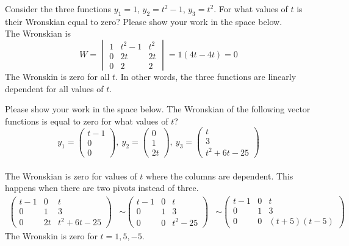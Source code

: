 \ifnum {}
\question[2] Consider the three functions $y_1 = 1$, $y_2 = t^2-1$, $y_3 = t^2$. For what values of $t$ is their Wronskian equal to zero? Please show your work in the space below. 
\ifnum {} {\color{DarkBlue} \\[12pt] The Wronskian is $$W = \begin{vmatrix} 1&t^2-1&t^2\\0&2t&2t\\0&2&2 \end{vmatrix} = 1(4t - 4t) =0$$ The Wronskin is zero for all $t$. In other words, the three functions are linearly dependent for all values of $t$.
} 
\else 
\vfill
\fi
\fi

\ifnum {}
\question[2] Please show your work in the space below. The Wronskian of the following vector functions is equal to zero for what values of $t$?  
$$y_1 = \begin{pmatrix} t-1\\0\\0\end{pmatrix}, \ y_2 = \begin{pmatrix} 0\\1\\2t\end{pmatrix}, \ y_3 = \begin{pmatrix} t\\3\\t^2+6t-25 \end{pmatrix}$$
\ifnum {} {\color{DarkBlue} \\[12pt] The Wronskian is zero for values of $t$ where the columns are dependent. This happens when there are two pivots instead of three. 
\begin{align}
    \begin{pmatrix} t-1&0&t\\0&1&3\\0&2t&t^2+6t-25\end{pmatrix} 
    &\sim \begin{pmatrix} t-1&0&t\\0&1&3\\0&0&t^2-25\end{pmatrix} 
    &\sim \begin{pmatrix} t-1&0&t\\0&1&3\\0&0&(t+5)(t-5)\end{pmatrix} 
\end{align} The Wronskin is zero for $t =1,5,-5$. 
} 
\else 
\vfill
\fi
\fi



